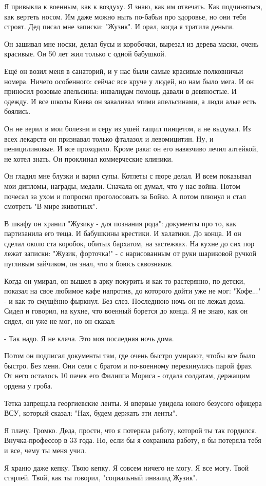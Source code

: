 Я привыкла к военным, как к воздуху. Я знаю, как им отвечать. Как подчиняться,
как вертеть носом. Им даже можно ныть по-бабьи про здоровье, но они тебя
строят. Дед писал мне записки: "Жузик". И орал, когда я тратила деньги.

Он зашивал мне носки, делал бусы и коробочки, вырезал из дерева маски, очень
красивые. Он 50 лет жил только с одной бабушкой.

Ещё он возил меня в санаторий, и у нас были самые красивые полковничьи номера.
Ничего особенного: сейчас все круче у людей, но нам было мега. И он приносил
розовые апельсины: инвалидам помощь давали в девяностые. И одежду. И все школы
Киева он заваливал этими апельсинами, а люди алые есть боялись.

Он не верил в мои болезни и серу из ушей тащил пинцетом, а не выдувал. Из всех
лекарств он признавал только фталазол  и левомицитин. Ну, и пеницилиновые. И
все проходило. Кроме рака: он его навязчиво лечил алтейкой, не хотел знать. Он
проклинал коммерческие клиники. 

Он гладил мне блузки и варил супы. Котлеты с пюре делал. И всем показывал мои
дипломы, награды, медали. Сначала он думал, что у нас война. Потом почесал за
ухом и попросил проголосовать за Бойко. А потом плюнул и стал смотреть "В мире
животных".

В шкафу он хранил "Жузику - для познания рода": документы про то, как
партизанила его теща. И бабушкины крестики. И халатики. До конца. И он сделал
около ста коробок, обитых бархатом, на застежках. На кухне до сих пор лежат
записки: "Жузик, форточка!" - с нарисованным от руки шариковой ручкой пугливым
зайчиком, он знал, что я боюсь сквозняков.

Когда он умирал, он вышел в арку покурить и как-то растерянно, по-детски,
показал на свое любимое кафе напротив, до которого дойти уже не мог: "Кофе..."
- и как-то смущённо фыркнул. Без слез. Последнюю ночь он не лежал дома. Сидел и
говорил, на кухне, что военный борется до конца. Я не знаю, как он сидел, он
уже не мог, но он сказал:

- Так надо. Я не кляча. Это моя последняя ночь дома.

Потом он подписал документы там, где очень быстро умирают, чтобы все было
быстро. Без меня. Они сели с братом и по-военному перекинулись парой фраз. От
него осталось 10 пачек его Филиппа Мориса - отдала солдатам, держащим ордена у
гроба.

Тетка запрещала георгиевские ленты. Я впервые увидела юного безусого офицера
ВСУ, который сказал: "Нах, будем держать эти ленты".

Я плачу. Громко. Деда, прости, что я потеряла работу, которой ты так гордился.
Внучка-профессор в 33 года. Но, если бы я сохранила работу, я бы потеряла тебя
и все, чему ты меня учил.

Я храню даже кепку. Твою кепку. Я совсем ничего не могу. Я все могу. Твой
старлей. Твой, как ты говорил, "социальный инвалид Жузик".
